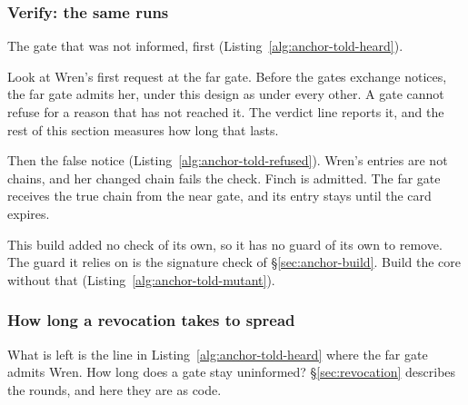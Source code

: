 \subsubsection{Verify: the same runs}

The gate that was not informed, first
(Listing~\ref{alg:anchor-told-heard}).


Look at Wren's first request at the far gate. Before the gates
exchange notices, the far gate admits her, under this design as
under every other. A gate cannot refuse for a reason that has not reached
it. The verdict line reports it, and the rest of this section measures how
long that lasts.

Then the false notice (Listing~\ref{alg:anchor-told-refused}). Wren's
entries are not chains, and her changed chain fails the check. Finch is
admitted. The far gate receives the true chain from the near gate, and its
entry stays until the card expires.


This build added no check of its own, so it has no guard of its own to
remove. The guard it relies on is the signature check of
\S\ref{sec:anchor-build}. Build the core without that
(Listing~\ref{alg:anchor-told-mutant}).


\subsubsection{How long a revocation takes to spread}

What is left is the line in Listing~\ref{alg:anchor-told-heard} where the
far gate admits Wren. How long does a gate stay uninformed?
\S\ref{sec:revocation} describes the rounds, and here they are as code.


